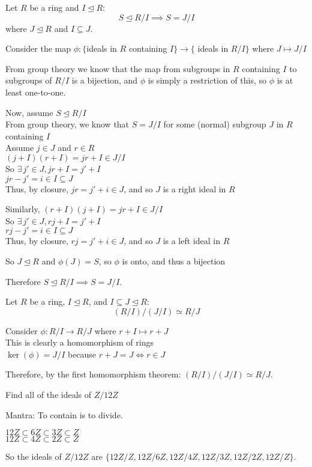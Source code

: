 \documentclass[letterpaper,12pt,fleqn]{article}
\newcommand{\ide}{\trianglelefteq}
\begin{document}
\begin{theorem}
  Let $R$ be a ring and $I\ide R$:
  \[S\ide R/I \implies S=J/I\]
  where $J\ide R$ and $I\subseteq J$.
\end{theorem}

\begin{theproof}
  Consider the map $\phi:\{$ideals in $R$ containing $I\}\to\{$ ideals in $R/I\}$
  where $J\mapsto J/I$

  From group theory we know that the map from subgroups in $R$ containing $I$ to
  subgroups of $R/I$ is a bijection, and $\phi$ is simply a restriction of this, so
  $\phi$ is at least one-to-one.

  Now, assume $S\ide R/I$ \\
  From group theory, we know that $S=J/I$ for some (normal) subgroup $J$ in $R$
  containing $I$ \\
  Assume $j\in J$ and $r\in R$ \\
  $(j+I)(r+I)=jr+I\in J/I$ \\
  So $\exists\,j'\in J,jr+I=j'+I$ \\
  $jr-j'=i\in I\subseteq J$ \\
  Thus, by closure, $jr=j'+i\in J$, and so $J$ is a right ideal in $R$

  Similarly, $(r+I)(j+I)=jr+I\in J/I$ \\
  So $\exists\,j'\in J,rj+I=j'+I$ \\
  $rj-j'=i\in I\subseteq J$ \\
  Thus, by closure, $rj=j'+i\in J$, and so $J$ is a left ideal in $R$

  So $J\ide R$ and $\phi(J)=S$, so $\phi$ is onto, and thus a bijection

  Therefore $S\ide R/I \implies S=J/I$.
\end{theproof}

\begin{theorem}
  Let $R$ be a ring, $I\ide R$, and $I\subseteq J\ide R$:
  \[(R/I)/(J/I)\simeq R/J\]
\end{theorem}

\begin{theproof}
  Consider $\phi:R/I\to R/J$ where $r+I\mapsto r+J$ \\
  This is clearly a homomorphism of rings \\
  $\ker(\phi)=J/I$ because $r+J=J\iff r\in J$

  Therefore, by the first homomorphism theorem: $(R/I)/(J/I)\simeq R/J$.
\end{theproof}
\newpage
\begin{example}
  Find all of the ideals of $Z/12Z$

  Mantra: To contain is to divide.

  $12Z\subset6Z\subset3Z\subset Z$ \\
  $12Z\subset4Z\subset2Z\subset Z$

  So the ideals of $Z/12Z$ are $\{12Z/Z,12Z/6Z,12Z/4Z,12Z/3Z,12Z/2Z,12Z/Z\}$.
\end{example}
\end{document}
